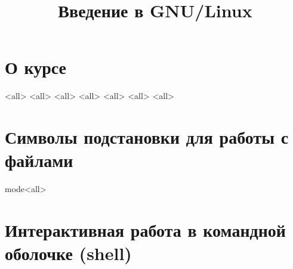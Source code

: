 

\title{Введение в GNU/Linux}




\begin{frame}
	\frametitle{}
	\titlepage
	\vspace{-0.5cm}
	\begin{center}
	\end{center}
\end{frame}


\begin{frame}
	\tableofcontents
	[hideallsubsections]
\end{frame}


\section{О курсе}

\mode<all>{}
\mode<all>{}
\mode<all>{}
\mode<all>{}
\mode<all>{}
\mode<all>{}
\mode<all>{}

\section{Символы подстановки для работы с файлами}
mode<all>{}
\section{Интерактивная работа в командной оболочке (shell)}

